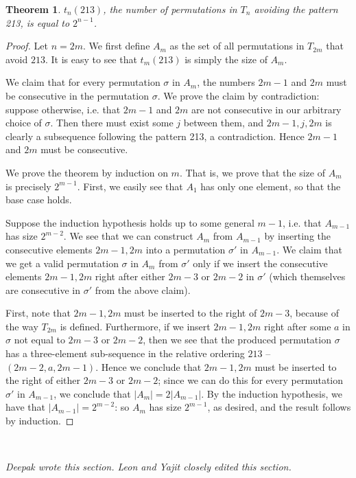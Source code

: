 \documentclass[11pt,letterpaper,twoside,english]{article}
\theoremstyle{theorem}
\newtheorem{theorem}{Theorem}[section]
\theoremstyle{remark}
\begin{document}
\begin{theorem}
$t_n(213)$, the number of permutations in $T_n$ avoiding the pattern 213, is equal to $2^{n-1}$.
\end{theorem}

\begin{proof}
Let $n=2m$. We first define $A_m$ as the set of all permutations in $T_{2m}$ that avoid $213$. It is easy to see that $t_m(213)$ is simply the size of $A_m$.

We claim that for every permutation $\sigma$ in $A_m$, the numbers $2m-1$ and $2m$ must be consecutive in the permutation $\sigma$. We prove the claim by contradiction: suppose otherwise, i.e. that $2m-1$ and $2m$ are not consecutive in our arbitrary choice of $\sigma$. Then there must exist some $j$ between them, and $2m-1, j, 2m$ is clearly a subsequence following the pattern 213, a contradiction. Hence $2m-1$ and $2m$ must be consecutive.

We prove the theorem by induction on $m$. That is, we prove that the size of $A_m$ is precisely $2^{m-1}$. First, we easily see that $A_1$ has only one element, so that the base case holds.

Suppose the induction hypothesis holds up to some general $m-1$, i.e. that $A_{m-1}$ has size $2^{m-2}$. We see that we can construct $A_m$ from $A_{m-1}$ by inserting the consecutive elements $2m-1, 2m$ into a permutation $\sigma'$ in $A_{m-1}$. We claim that we get a valid permutation $\sigma$ in $A_m$ from $\sigma'$ only if we insert the consecutive elements $2m-1, 2m$ right after either $2m-3$ or $2m-2$ in $\sigma'$ (which themselves are consecutive in $\sigma'$ from the above claim).

First, note that $2m-1, 2m$ must be inserted to the right of  $2m-3$, because of the way $T_{2m}$ is defined. Furthermore, if we insert $2m-1, 2m$ right after some $a$ in $\sigma$ not equal to $2m-3$ or $2m-2$, then we see that the produced permutation $\sigma$ has a three-element sub-sequence in the relative ordering $213$ -- $(2m-2, a, 2m-1)$. Hence we conclude that $2m-1, 2m$ must be inserted to the right of either $2m-3$ or $2m-2$; since we can do this for every permutation $\sigma'$ in $A_{m-1}$, we conclude that $|A_m| = 2|A_{m-1}|$. By the induction hypothesis, we have that $|A_{m-1}|=2^{m-2}$: so $A_m$ has size $2^{m-1}$, as desired, and the result follows by induction.
\end{proof}

\

\emph{Deepak wrote this section. Leon and Yajit closely edited this section.}
\end{document}
